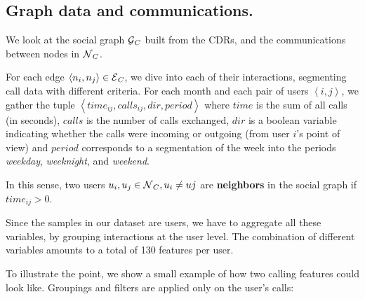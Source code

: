 \subsection{Graph data and communications.}

We look at the social graph $\operatorname{\mathcal{G}}_C$ built from the CDRs, and the communications between nodes in $\operatorname{\mathcal{N}}_C$.

For each edge $\left< n_i, n_j \right> \in \operatorname{\mathcal{E}}_C$, we dive into each of their interactions, segmenting call data with different criteria. For %
each month and each pair of users $\left< i,j \right>$, we gather the tuple $\left< time_{ij}, calls_{ij}, dir, period \right>$ where $time$ is the sum of all calls (in seconds), $calls$ is the number of calls exchanged, $dir$ is a boolean variable indicating whether the calls were incoming or outgoing (from user $i$'s point of view) and $period$ corresponds to a segmentation of the week into the periods \textit{weekday}, \textit{weeknight}, and \textit{weekend}.


In this sense, two users $u_i, u_j \in \operatorname{\mathcal{N}}_C, u_i \neq uj$ are \textbf{neighbors} in the social graph if $time_{ij} > 0$.



Since the samples in our dataset are users, we have to aggregate all these variables, by grouping interactions at the user level. The combination of different variables amounts to a total of 130 features per user.

To illustrate the point, we show a small example of how two calling features could look like. Groupings and filters are applied only on the user's calls:


